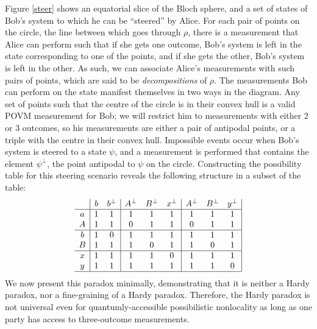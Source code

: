 \documentclass[reprint]{revtex4-1}
\theoremstyle{definition}
\begin{document}
Figure \ref{steer} shows an equatorial slice of the Bloch sphere, and a set of states of Bob's system to which he can be ``steered'' by Alice. For each pair of points on the circle, the line between which goes through $\rho$, there is a measurement that Alice can perform such that if she gets one outcome, Bob's system is left in the state corresponding to one of the points, and if she gets the other, Bob's system is left in the other. As such, we can associate Alice's measurements with such pairs of points, which are said to be \emph{decompositions} of $\rho$. The measurements Bob can perform on the state manifest themselves in two ways in the diagram. Any set of points such that the centre of the circle is in their convex hull is a valid POVM measurement for Bob; we will restrict him to measurements with either 2 or 3 outcomes, so his measurements are either a pair of antipodal points, or a triple with the centre in their convex hull. Impossible events occur when Bob's system is steered to a state $\psi$, and a measurement is performed that contains the element $\psi^\perp$, the point antipodal to $\psi$ on the circle. Constructing the possibility table for this steering scenario reveals the following structure in a subset of the table:
\begin{equation*}
\begin{array}{ c  | c c | c c c| c c c|}\
  & b&b^\perp& A^\perp &B^\perp&x^\perp& A^\perp &B^\perp&y^\perp \\ \hline
  a &1&1&1&1&1&1&1&1\\ 
  A &1&1&0&1&1&0&1&1\\ \hline
  b &1&0&1&1&1&1&1&1\\ 
 B  &1&1&1&0&1&1&0&1\\ \hline
 x &1&1&1&1&0&1&1&1\\ 
 y &1&1&1&1&1&1&1&0\\ \hline
\end{array}
\end{equation*}
We now present this paradox minimally, demonstrating that it is neither a Hardy paradox, nor a fine-graining of a Hardy paradox. Therefore, the Hardy paradox is not universal even for quantumly-accessible possibilistic nonlocality as long as one party has access to three-outcome measurements. 
\end{document}
